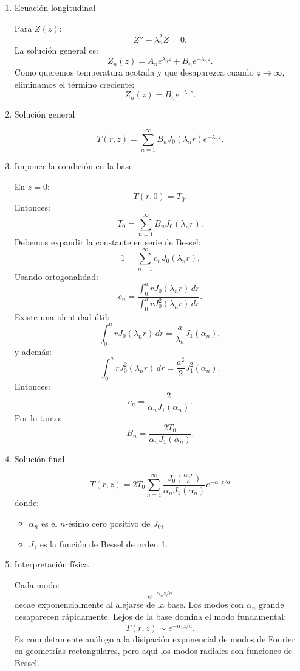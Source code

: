 \documentclass[11pt,spanish]{article}
\begin{document}
\begin{enumerate}
\item Ecuación longitudinal

Para $Z(z)$:
$$
Z''-\lambda_n^2 Z=0.
$$
La solución general es:
$$
Z_n(z)=
A_ne^{\lambda_n z}
+
B_ne^{-\lambda_n z}.
$$
Como queremos temperatura acotada y que desaparezca cuando $z\to\infty$, eliminamos el término creciente:
$$
Z_n(z)=B_ne^{-\lambda_n z}.
$$

\item Solución general

$$
T(r,z)=
\sum_{n=1}^\infty
B_n
J_0(\lambda_n r)
e^{-\lambda_n z}.
$$

\item Imponer la condición en la base

En $z=0$:
$$
T(r,0)=T_0.
$$
Entonces:
$$
T_0=
\sum_{n=1}^\infty
B_nJ_0(\lambda_n r).
$$
Debemos expandir la constante en serie de Bessel:
$$
1=
\sum_{n=1}^\infty
c_nJ_0(\lambda_n r).
$$
Usando ortogonalidad:
$$
c_n=
\frac{
\displaystyle
\int_0^a rJ_0(\lambda_n r)\,dr
}{
\displaystyle
\int_0^a rJ_0^2(\lambda_n r)\,dr
}.
$$
Existe una identidad útil:
$$
\int_0^a rJ_0(\lambda_n r)\,dr
=
\frac{a}{\lambda_n}J_1(\alpha_n),
$$
y además:
$$
\int_0^a rJ_0^2(\lambda_n r)\,dr
=
\frac{a^2}{2}J_1^2(\alpha_n).
$$
Entonces:
$$
c_n=
\frac{2}{\alpha_n J_1(\alpha_n)}.
$$
Por lo tanto:
$$
B_n=
\frac{2T_0}{\alpha_n J_1(\alpha_n)}.
$$

\item Solución final

$$
\boxed{
T(r,z)=
2T_0
\sum_{n=1}^\infty
\frac{
J_0\left(\frac{\alpha_n r}{a}\right)
}{
\alpha_n J_1(\alpha_n)
}
e^{-\alpha_n z/a}
}
$$
donde:
\begin{itemize}
\item $\alpha_n$ es el $n$-ésimo cero positivo de $J_0$,
\item $J_1$ es la función de Bessel de orden 1.
\end{itemize}

\item Interpretación física

Cada modo:
$$
e^{-\alpha_n z/a}
$$
decae exponencialmente al alejarse de la base.
Los modos con $\alpha_n$ grande desaparecen rápidamente.
Lejos de la base domina el modo fundamental:
$$
T(r,z)\sim
e^{-\alpha_1 z/a}.
$$
Es completamente análogo a la disipación exponencial de modos de Fourier en geometrías rectangulares, pero aquí los modos radiales son funciones de Bessel.

\end{enumerate}
\end{document}
